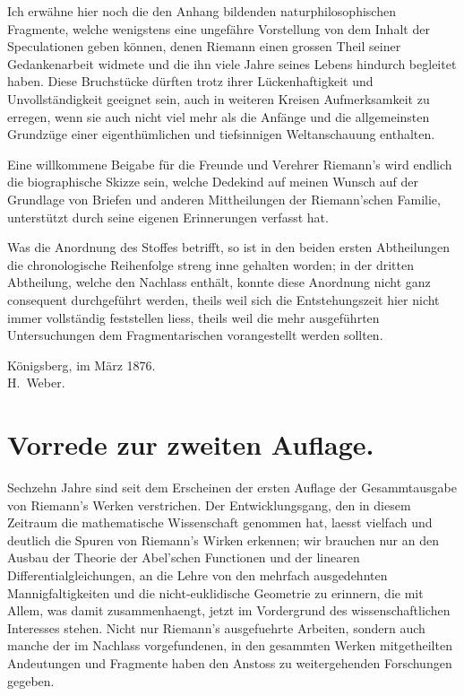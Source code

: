 \documentclass[11pt,a4paper]{article}
\theoremstyle{plain}
\theoremstyle{definition}
\begin{document}
Ich erw\"ahne hier noch die den Anhang bildenden naturphilosophischen Fragmente, welche wenigstens eine ungef\"ahre Vorstellung von dem Inhalt der Speculationen geben k\"onnen, denen Riemann einen grossen Theil seiner Gedankenarbeit widmete und die ihn viele Jahre seines Lebens hindurch begleitet haben. Diese Bruchst\"ucke d\"urften trotz ihrer L\"uckenhaftigkeit und Unvollst\"andigkeit geeignet sein, auch in weiteren Kreisen Aufmerksamkeit zu erregen, wenn sie auch nicht viel mehr als die Anf\"ange und die allgemeinsten Grundz\"uge einer eigenth\"umlichen und tiefsinnigen Weltanschauung enthalten.

Eine willkommene Beigabe f\"ur die Freunde und Verehrer Riemann's wird endlich die biographische Skizze sein, welche Dedekind auf meinen Wunsch auf der Grundlage von Briefen und anderen Mittheilungen der Riemann'schen Familie, unterst\"utzt durch seine eigenen Erinnerungen verfasst hat.

Was die Anordnung des Stoffes betrifft, so ist in den beiden ersten Abtheilungen die chronologische Reihenfolge streng inne gehalten worden; in der dritten Abtheilung, welche den Nachlass enth\"alt, konnte diese Anordnung nicht ganz consequent durchgef\"uhrt werden, theils weil sich die Entstehungszeit hier nicht immer vollst\"andig feststellen liess, theils weil die mehr ausgef\"uhrten Untersuchungen dem Fragmentarischen vorangestellt werden sollten.

\begin{flushright}
K\"onigsberg, im M\"arz 1876.\\
H.\ Weber.
\end{flushright}

\clearpage

\section*{Vorrede zur zweiten Auflage.}

Sechzehn Jahre sind seit dem Erscheinen der ersten Auflage der Gesammtausgabe von Riemann's Werken verstrichen. Der Entwicklungsgang, den in diesem Zeitraum die mathematische Wissenschaft genommen hat, laesst vielfach und deutlich die Spuren von Riemann's Wirken erkennen; wir brauchen nur an den Ausbau der Theorie der Abel'schen Functionen und der linearen Differentialgleichungen, an die Lehre von den mehrfach ausgedehnten Mannigfaltigkeiten und die nicht-euklidische Geometrie zu erinnern, die mit Allem, was damit zusammenhaengt, jetzt im Vordergrund des wissenschaftlichen Interesses stehen. Nicht nur Riemann's ausgefuehrte Arbeiten, sondern auch manche der im Nachlass vorgefundenen, in den gesammten Werken mitgetheilten Andeutungen und Fragmente haben den Anstoss zu weitergehenden Forschungen gegeben.
\end{document}
